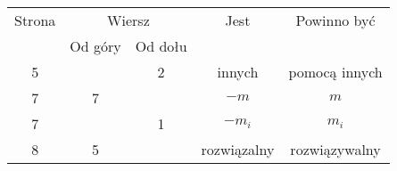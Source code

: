 \documentclass[a4paper,11pt]{article}
\numberwithin{equation}{section}
\begin{document}
\VerSpaceFive


\begin{center}

  \begin{tabular}{|c|c|c|c|c|}
    \hline
    Strona & \multicolumn{2}{c|}{Wiersz} & Jest
    & Powinno być \\ \cline{2-3}
    & Od góry & Od dołu & & \\
    \hline
    \hphantom{0}5 & & \hphantom{0}2 & innych & pomocą innych \\
    \hphantom{0}7 & \hphantom{0}7 & & $-m$ & $m$ \\
    \hphantom{0}7 & & \hphantom{0}1 & $-m_{ i }$ & $m_{ i }$ \\
    \hphantom{0}8 & \hphantom{0}5 & & rozwiązalny & rozwiązywalny \\
    \hline
  \end{tabular}

\end{center}

\VerSpaceTwo













\printbibliography





\end{document}
